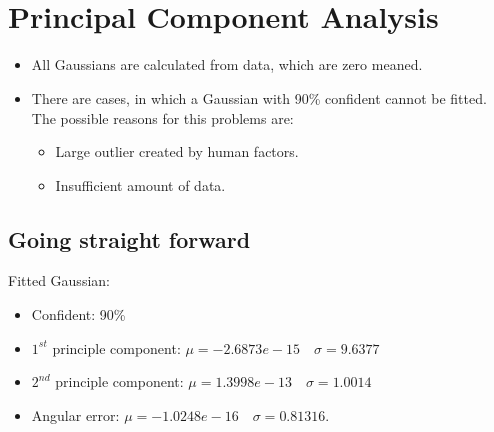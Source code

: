 \documentclass[paper=a4, fontsize=11pt]{scrartcl} %
\title{\hmwkClass \\
       \hmwkTitle}
\author{\hmwkAuthorFullName}
\date{\hmwkDueDate}
\begin{document}
    \maketitle
    \thispagestyle{fancy} %
    
    \section{Principal Component Analysis}
    \begin{itemize}
    	\item All Gaussians are calculated from data, which are zero meaned.
        \item There are cases, in which a Gaussian with 90\% confident cannot be fitted. The possible reasons for this problems are:
        \begin{itemize}
        	\item Large outlier created by human factors.
            \item Insufficient amount of data.
        \end{itemize}

    \end{itemize}

    \subsection{Going straight forward}
    Fitted Gaussian:
    \begin{itemize}
    	\item Confident: 90\%
	    \item $1^{st}$ principle component: $\mu = -2.6873e-15 \quad \sigma = 9.6377$
	    \item $2^{nd}$ principle component: $\mu = 1.3998e-13 \quad \sigma = 1.0014$
	    \item Angular error: $\mu = -1.0248e-16 \quad \sigma = 0.81316$.
    \end{itemize}
    
\end{document}
